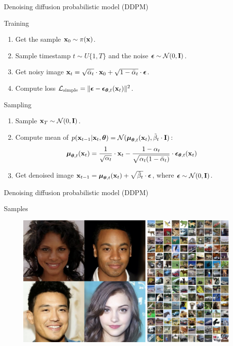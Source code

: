 \begin{frame}{Denoising diffusion probabilistic model (DDPM)}
	\begin{block}{Training}
		\begin{enumerate}
			\item Get the sample $\mathbf{x}_0 \sim \pi(\mathbf{x})$.
			\item Sample timestamp $t \sim U\{1, T\}$ and the noise $\boldsymbol{\epsilon} \sim \mathcal{N}(0, \mathbf{I})$.
			\item Get noisy image $\mathbf{x}_t = \sqrt{\bar{\alpha}_t} \cdot \mathbf{x}_0 + \sqrt{1 - \bar{\alpha}_t} \cdot \boldsymbol{\epsilon}$.
			\item Compute loss $ \mathcal{L}_{\text{simple}} = \| \boldsymbol{\epsilon} - \boldsymbol{\epsilon}_{\boldsymbol{\theta}, t}(\mathbf{x}_t) \|^2 $.
		\end{enumerate}
	\end{block}
	\begin{block}{Sampling}
		\begin{enumerate}
			\item Sample $\mathbf{x}_T \sim \mathcal{N}(0, \mathbf{I})$.
			\item Compute mean of $p(\mathbf{x}_{t-1} | \mathbf{x}_t, \boldsymbol{\theta}) = \mathcal{N}(\boldsymbol{\mu}_{\boldsymbol{\theta}, t}(\mathbf{x}_t), \tilde{\beta}_t \cdot \mathbf{I})$:
			\[
				\boldsymbol{\mu}_{\boldsymbol{\theta}, t}(\mathbf{x}_t) = \frac{1}{\sqrt{\alpha_t}} \cdot \mathbf{x}_t - \frac{1 - \alpha_t}{\sqrt{\alpha_t (1 - \bar{\alpha}_t)}} \cdot \boldsymbol{\epsilon}_{\boldsymbol{\theta}, t}(\mathbf{x}_t)
			\]
			\vspace{-0.3cm}
			\item Get denoised image $\mathbf{x}_{t - 1} = \boldsymbol{\mu}_{\boldsymbol{\theta}, t}(\mathbf{x}_t) +  \sqrt{\tilde{\beta}_t} \cdot \boldsymbol{\epsilon}$, where $\boldsymbol{\epsilon} \sim \mathcal{N}(0, \mathbf{I})$.
		\end{enumerate}
	\end{block}
\end{frame}
\begin{frame}{Denoising diffusion probabilistic model (DDPM)}
	\begin{block}{Samples}
		\begin{figure}
			\includegraphics[width=\linewidth]{figs/ddpm_samples}
		\end{figure}
	\end{block}
\end{frame}
